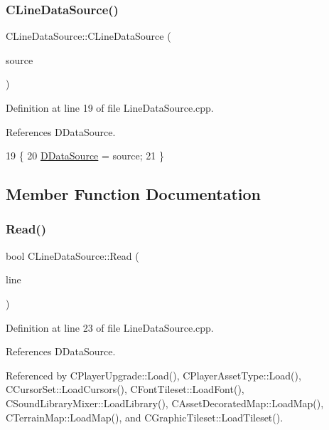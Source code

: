 \subsubsection{\texorpdfstring{C\+Line\+Data\+Source()}{CLineDataSource()}}
{\footnotesize\ttfamily C\+Line\+Data\+Source\+::\+C\+Line\+Data\+Source (\begin{DoxyParamCaption}\item[{std\+::shared\+\_\+ptr$<$ \hyperlink{classCDataSource}{C\+Data\+Source} $>$}]{source }\end{DoxyParamCaption})}



Definition at line 19 of file Line\+Data\+Source.\+cpp.



References D\+Data\+Source.


\begin{DoxyCode}
19                                                                    \{
20     \hyperlink{classCLineDataSource_a976b7e02379cb8b29eb16cfedd1352cb}{DDataSource} = source;
21 \}
\end{DoxyCode}


\subsection{Member Function Documentation}
\hypertarget{classCLineDataSource_a569f5a9732d73ac8813c0ba4860e2e66}{}\label{classCLineDataSource_a569f5a9732d73ac8813c0ba4860e2e66} 
\subsubsection{\texorpdfstring{Read()}{Read()}}
{\footnotesize\ttfamily bool C\+Line\+Data\+Source\+::\+Read (\begin{DoxyParamCaption}\item[{std\+::string \&}]{line }\end{DoxyParamCaption})}



Definition at line 23 of file Line\+Data\+Source.\+cpp.



References D\+Data\+Source.



Referenced by C\+Player\+Upgrade\+::\+Load(), C\+Player\+Asset\+Type\+::\+Load(), C\+Cursor\+Set\+::\+Load\+Cursors(), C\+Font\+Tileset\+::\+Load\+Font(), C\+Sound\+Library\+Mixer\+::\+Load\+Library(), C\+Asset\+Decorated\+Map\+::\+Load\+Map(), C\+Terrain\+Map\+::\+Load\+Map(), and C\+Graphic\+Tileset\+::\+Load\+Tileset().


